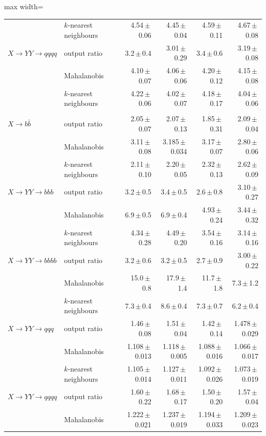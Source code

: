 \begin{table}[t]
\begin{adjustbox}{max width=\linewidth}
\begin{tabular}{l l rrrr}
 & $k$-nearest neighbours & 4.54\,$\pm$\,0.06 & 4.45\,$\pm$\,0.04 & 4.59\,$\pm$\,0.11 & 4.67\,$\pm$\,0.08 \\
$X\to YY\to qqqq$ & output ratio & 3.2\,$\pm$\,0.4 & 3.01\,$\pm$\,0.29 & 3.4\,$\pm$\,0.6 & 3.19\,$\pm$\,0.08 \\
 & Mahalanobis & 4.10\,$\pm$\,0.07 & 4.06\,$\pm$\,0.06 & 4.20\,$\pm$\,0.12 & 4.15\,$\pm$\,0.08 \\
 & $k$-nearest neighbours & 4.22\,$\pm$\,0.06 & 4.02\,$\pm$\,0.07 & 4.18\,$\pm$\,0.17 & 4.04\,$\pm$\,0.06 \\
\addlinespace
\multicolumn{6}{@{}l}{\itshape max SIC} \\
$X\to b\bar b$ & output ratio & 2.05\,$\pm$\,0.07 & 2.07\,$\pm$\,0.13 & 1.85\,$\pm$\,0.31 & 2.09\,$\pm$\,0.04 \\
 & Mahalanobis & 3.11\,$\pm$\,0.08 & 3.185\,$\pm$\,0.034 & 3.17\,$\pm$\,0.07 & 2.80\,$\pm$\,0.06 \\
 & $k$-nearest neighbours & 2.11\,$\pm$\,0.10 & 2.20\,$\pm$\,0.05 & 2.32\,$\pm$\,0.13 & 2.62\,$\pm$\,0.09 \\
$X\to YY\to bbb$ & output ratio & 3.2\,$\pm$\,0.5 & 3.4\,$\pm$\,0.5 & 2.6\,$\pm$\,0.8 & 3.10\,$\pm$\,0.27 \\
 & Mahalanobis & 6.9\,$\pm$\,0.5 & 6.9\,$\pm$\,0.4 & 4.93\,$\pm$\,0.24 & 3.44\,$\pm$\,0.32 \\
 & $k$-nearest neighbours & 4.34\,$\pm$\,0.28 & 4.49\,$\pm$\,0.20 & 3.54\,$\pm$\,0.16 & 3.14\,$\pm$\,0.16 \\
$X\to YY\to bbbb$ & output ratio & 3.2\,$\pm$\,0.6 & 3.2\,$\pm$\,0.5 & 2.7\,$\pm$\,0.9 & 3.00\,$\pm$\,0.22 \\
 & Mahalanobis & 15.0\,$\pm$\,0.8 & 17.9\,$\pm$\,1.4 & 11.7\,$\pm$\,1.8 & 7.3\,$\pm$\,1.2 \\
 & $k$-nearest neighbours & 7.3\,$\pm$\,0.4 & 8.6\,$\pm$\,0.4 & 7.3\,$\pm$\,0.7 & 6.2\,$\pm$\,0.4 \\
$X\to YY\to qqq$ & output ratio & 1.46\,$\pm$\,0.08 & 1.51\,$\pm$\,0.04 & 1.42\,$\pm$\,0.14 & 1.478\,$\pm$\,0.029 \\
 & Mahalanobis & 1.108\,$\pm$\,0.013 & 1.118\,$\pm$\,0.005 & 1.088\,$\pm$\,0.016 & 1.066\,$\pm$\,0.017 \\
 & $k$-nearest neighbours & 1.105\,$\pm$\,0.014 & 1.127\,$\pm$\,0.011 & 1.092\,$\pm$\,0.026 & 1.073\,$\pm$\,0.019 \\
$X\to YY\to qqqq$ & output ratio & 1.60\,$\pm$\,0.22 & 1.68\,$\pm$\,0.17 & 1.50\,$\pm$\,0.20 & 1.57\,$\pm$\,0.04 \\
 & Mahalanobis & 1.222\,$\pm$\,0.021 & 1.237\,$\pm$\,0.019 & 1.194\,$\pm$\,0.033 & 1.209\,$\pm$\,0.023 \\

\end{tabular}
\end{adjustbox}
\end{table}
